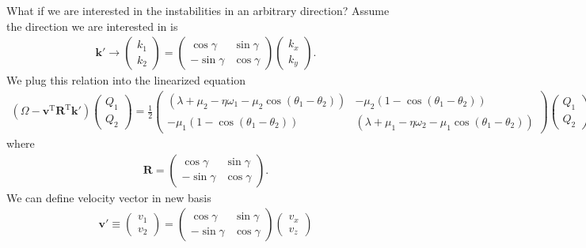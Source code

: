 \documentclass[letterpaper,12pt,english]{sphinxmanual}
\begin{document}
What if we are interested in the instabilities in an arbitrary direction? Assume the direction we are interested in is
\begin{equation*}
\begin{split}\mathbf k'\to \begin{pmatrix}
k_1\\
k_2
\end{pmatrix} = \begin{pmatrix}
\cos\gamma & \sin\gamma\\
-\sin\gamma & \cos\gamma
\end{pmatrix}\begin{pmatrix}
k_x\\
k_y
\end{pmatrix}.\end{split}
\end{equation*}
We plug this relation into the linearized equation
\begin{equation*}
\begin{split}(\Omega-\mathbf v^{\mathrm T}\mathbf R^{\mathrm T} \mathbf k')\begin{pmatrix}
Q_1 \\
Q_2
\end{pmatrix} =
\frac{1}{2}\begin{pmatrix}
(\lambda+ \mu_2 - \eta \omega_1 - \mu_2 \cos(\theta_1-\theta_2) ) & -\mu_2 (1-\cos(\theta_1-\theta_2)) \\
-\mu_1 (1- \cos(\theta_1-\theta_2)) & (\lambda + \mu_1 - \eta \omega_2 - \mu_1 \cos(\theta_1-\theta_2) )
\end{pmatrix}\begin{pmatrix}
Q_1 \\
Q_2
\end{pmatrix},\end{split}
\end{equation*}
where
\begin{equation*}
\begin{split}\mathbf R =\begin{pmatrix}
\cos\gamma & \sin\gamma\\
-\sin\gamma & \cos\gamma
\end{pmatrix}.\end{split}
\end{equation*}
We can define velocity vector in new basis
\label{\detokenize{collective/directional-instability:equation-eqn-new-velocity-with-rotation}}\begin{equation}\label{equation:collective/directional-instability:eqn-new-velocity-with-rotation}
\begin{split}\mathbf v' \equiv \begin{pmatrix}
v_1 \\
v_2
\end{pmatrix} = \begin{pmatrix}
\cos\gamma & \sin\gamma\\
-\sin\gamma & \cos\gamma
\end{pmatrix}\begin{pmatrix}
v_x \\
v_z
\end{pmatrix}\end{split}
\end{equation}
\end{document}
